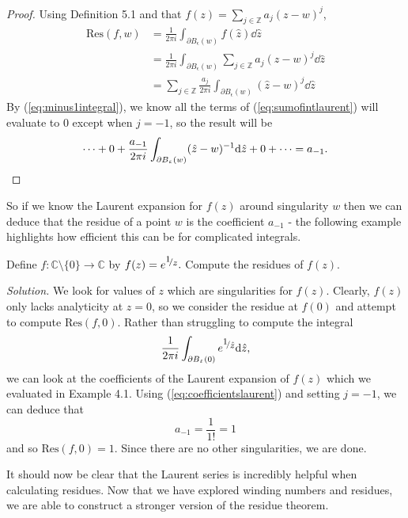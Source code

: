 \documentclass[a4paper]{article}
\def\nicefrac#1#2{%
    \raise.5ex\hbox{\begin{footnotesize}$#1$\end{footnotesize}}%
    \kern-.15em/\kern-.035em%
    \lower.25ex\hbox{\begin{footnotesize}$#2$\end{footnotesize}}}
\def\Res{\text{Res}}
\begin{document}
\begin{proof}
Using Definition 5.1 and that $f(z) = \sum_{j \in \mathbb{Z}} a_{j}(z-w)^{j}$, 
\begin{align}
\Res(f,w) &=\frac{1}{2\pi i}\int_{\partial B_{\upvarepsilon}(w)} f(\hat{z}) \dd \hat{z} \nonumber \\
& = \frac{1}{2\pi i}\int_{\partial B_{\upvarepsilon}(w)} \sum_{j \in \mathbb{Z}} a_{j}(\hat{z}-w)^{j} \dd \hat{z} \nonumber \\
& \label{eq:sumofintlaurent} = \sum_{j \in \mathbb{Z}} \frac{a_{j}}{2\pi i}\int_{\partial B_{\upvarepsilon}(w)} (\hat{z}-w)^{j} \dd \hat{z} 
\end{align}
By (\ref{eq:minus1integral}), we know all the terms of (\ref{eq:sumofintlaurent}) will evaluate to $0$ except when $j=-1$, so the result will be 
\[ \dotsb + 0 + \frac{a_{-1}}{2\pi i}\int_{\partial B_{\upvarepsilon}(w)} (\hat{z}-w)^{-1} \dd \hat{z} + 0 + \dotsb = a_{-1}. \qedhere \]
\end{proof}

So if we know the Laurent expansion for $f(z)$ around singularity $w$ then we can deduce that the residue of a point $w$ is the coefficient $a_{-1}$ - the following example highlights how efficient this can be for complicated integrals.


\begin{example}{}{}\label{thm:expresexample}
Define $f: \mathbb{C}\setminus\{0\} \rightarrow \mathbb{C}$ by $f(z)=e^{\nicefrac{1}{z}}.$ Compute the residues of $f(z)$.
\end{example} 
\noindent\textit{Solution.}
We look for values of $z$ which are singularities for $f(z)$. Clearly, $f(z)$ only lacks analyticity at $z=0$, so we consider the residue at $f(0)$ and attempt to compute $\Res (f,0)$. Rather than struggling to compute the integral
\[\frac{1}{2\pi i}\int_{\partial B_{\upvarepsilon}(0)} e^{\nicefrac{1}{\hat{z}}} \dd \hat{z},\]
we can look at the coefficients of the Laurent expansion of $f(z)$ which we evaluated in Example 4.1. Using (\ref{eq:coefficientslaurent}) and setting $j=-1$, we can deduce that
\[a_{-1} = \frac{1}{1!} = 1\]
and so $\Res (f,0)=1$. Since there are no other singularities, we are done.

It should now be clear that the Laurent series is incredibly helpful when calculating residues. Now that we have explored winding numbers and residues, we are able to construct a stronger version of the residue theorem. 
\end{document}

